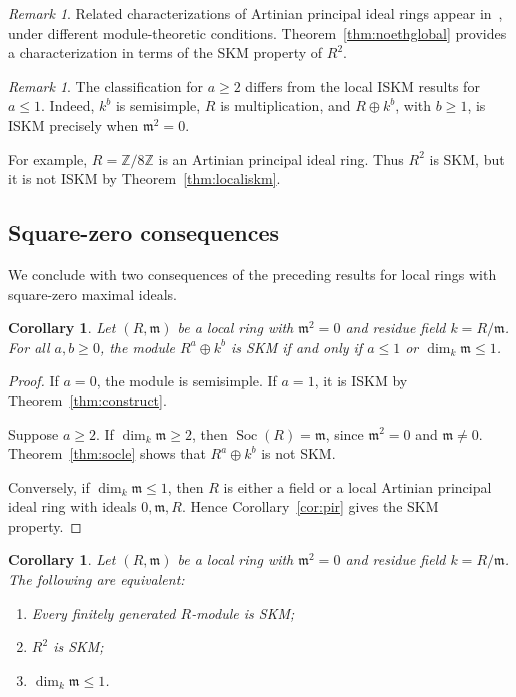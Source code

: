 \documentclass[11pt,a4paper]{article}
\newtheorem{corollary}[theorem]{Corollary}
\theoremstyle{definition}
\theoremstyle{remark}
\newtheorem{remark}[theorem]{Remark}
\begin{document}
\begin{remark}
\label{rem:artnovelty}
Related characterizations of Artinian principal
ideal rings appear in~\cite{Alvarado2019,Cejudo2025},
under different module-theoretic conditions.
Theorem~\ref{thm:noethglobal} provides a
characterization in terms of the SKM property
of $R^2$.
\end{remark}

\begin{remark}
The classification for $a\geq2$ differs from the local ISKM results for $a\leq1$. Indeed, $k^b$ is semisimple, $R$ is multiplication, and $R\oplus k^b$, with $b\geq1$, is ISKM precisely when $\mathfrak m^2=0$.

For example, $R=\mathbb Z/8\mathbb Z$ is an Artinian principal ideal ring. Thus $R^2$ is SKM, but it is not ISKM by Theorem~\ref{thm:localiskm}.
\end{remark}


\subsection{Square-zero consequences}

We conclude with two consequences of the preceding results for local rings with square-zero maximal ideals.

\begin{corollary}
\label{thm:completeSKM}
Let $(R,\mathfrak m)$ be a local ring with $\mathfrak m^2=0$ and residue field $k=R/\mathfrak m$. For all $a,b\geq0$, the module $R^a\oplus k^b$ is SKM if and only if $a\leq1$ or $\dim_k\mathfrak m\leq1$.
\end{corollary}

\begin{proof}
If $a=0$, the module is semisimple. If $a=1$, it is ISKM by Theorem~\ref{thm:construct}.

Suppose $a\geq2$. If $\dim_k\mathfrak m\geq2$, then $\operatorname{Soc}(R)=\mathfrak m$, since $\mathfrak m^2=0$ and $\mathfrak m\ne0$. Theorem~\ref{thm:socle} shows that $R^a\oplus k^b$ is not SKM.

Conversely, if $\dim_k\mathfrak m\leq1$, then $R$ is either a field or a local Artinian principal ideal ring with ideals $0,\mathfrak m,R$. Hence Corollary~\ref{cor:pir} gives the SKM property.
\end{proof}

\begin{corollary}
\label{cor:R2skm}
Let $(R,\mathfrak m)$ be a local ring with $\mathfrak m^2=0$ and residue field $k=R/\mathfrak m$. The following are equivalent:
\begin{enumerate}[label=\textup{(\roman*)}]
\item Every finitely generated $R$-module is SKM;
\item $R^2$ is SKM;
\item $\dim_k\mathfrak m\leq1$.
\end{enumerate}
\end{corollary}
\end{document}
